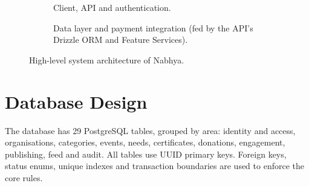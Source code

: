 \begin{figure}[H]
    \centering
    \begin{subfigure}[t]{\textwidth}
        \centering
        \caption{Client, API and authentication.}
    \end{subfigure}
    \par\vspace{0.2in}
    \begin{subfigure}[t]{\textwidth}
        \centering
        \caption{Data layer and payment integration (fed by the API's Drizzle ORM and Feature Services).}
    \end{subfigure}
    \caption{High-level system architecture of Nabhya.}
    \label{fig:architecture}
\end{figure}

\section{Database Design}
The database has 29 PostgreSQL tables, grouped by area: identity and access, organisations, categories, events, needs, certificates, donations, engagement, publishing, feed and audit. All tables use UUID primary keys. Foreign keys, status enums, unique indexes and transaction boundaries are used to enforce the core rules.

